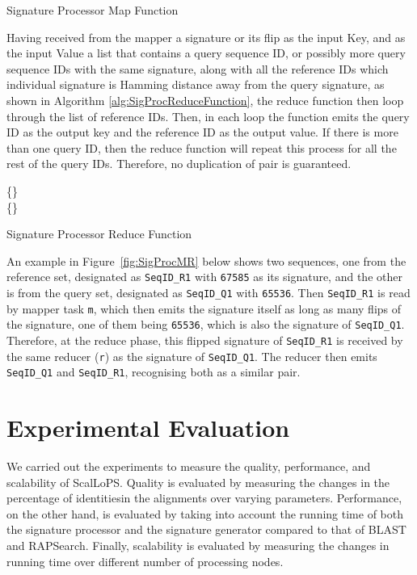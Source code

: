 \documentclass[titlepage]{csetr}
\begin{document}
\begin{algorithm} [t]
\SetAlgoLined
 	
\caption{Signature Processor Map Function}
\label{alg:SigProcMapFunction}
\end{algorithm}

Having received from the mapper a signature or its flip as the input Key, and as the input Value a list that contains a query sequence ID, or possibly more query sequence IDs with the same signature, along with all the reference IDs which individual signature is  Hamming distance away from the query signature, as shown in Algorithm \ref{alg:SigProcReduceFunction}, the reduce function then loop through the list of reference IDs. Then, in each loop the function emits the query ID as the output key and the reference ID as the output value. If there is more than one query ID, then the reduce function will repeat this process for all the rest of the query IDs. Therefore, no duplication of pair is guaranteed.

\begin{algorithm} [t]
\SetAlgoLined
	 \{\}\\
	 \{\}\\
 \caption{Signature Processor Reduce Function}
\label{alg:SigProcReduceFunction}
\end{algorithm}

An example in Figure~\ref{fig:SigProcMR} below shows two sequences, one from the reference set, designated as \texttt{SeqID\_R1} with \texttt{67585} as its signature, and the other is from the query set, designated as \texttt{SeqID\_Q1} with \texttt{65536}. Then \texttt{SeqID\_R1} is read by mapper task \texttt{m}, which then emits the signature itself as long as many flips of the signature, one of them being \texttt{65536}, which is also the signature of \texttt{SeqID\_Q1}. Therefore, at the reduce phase, this flipped signature of \texttt{SeqID\_R1} is received by the same reducer (\texttt{r}) as the signature of \texttt{SeqID\_Q1}. The reducer then emits \texttt{SeqID\_Q1} and \texttt{SeqID\_R1}, recognising both as a similar pair.

\section{Experimental Evaluation}
\label{sec:Evaluation}
We carried out the experiments to measure the quality, performance, and scalability of ScalLoPS. Quality is evaluated by measuring the changes in the percentage of identitiesin the alignments over varying parameters. Performance, on the other hand, is evaluated by taking into account the running time of both the signature processor and the signature generator compared to that of BLAST and RAPSearch. Finally, scalability is evaluated by measuring the changes in running time over different number of processing nodes.
\end{document}
